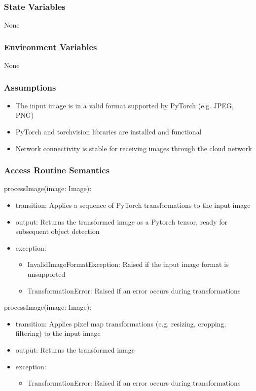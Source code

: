 \documentclass[12pt, titlepage]{article}
\begin{document}
\subsubsection{State Variables}
None



\subsubsection{Environment Variables}
None

\subsubsection{Assumptions}
\begin{itemize}
  \item The input image is in a valid format supported by PyTorch (e.g. JPEG, PNG)
  \item PyTorch and torchvision libraries are installed and functional
  \item Network connectivity is stable for receiving images through the cloud network
\end{itemize}


\subsubsection{Access Routine Semantics}

\noindent processImage(image: Image):
\begin{itemize}
\item transition: Applies a sequence of PyTorch transformations to the input image 
\item output: Returns the transformed image as a Pytorch tensor, ready for subsequent object detection
\item exception: 
\begin{itemize}
  \item InvalidImageFormatException: Raised if the input image format is unsupported
  \item TransformationError: Raised if an error occurs during transformations
\end{itemize}

\end{itemize}
\noindent processImage(image: Image):
\begin{itemize}
  \item transition: Applies pixel map transformations (e.g. resizing, cropping, filtering) to the input image
  \item output: Returns the transformed image
  \item exception: 
  \begin{itemize}
    \item TransformationError: Raised if an error occurs during transformations
  \end{itemize}
  
  \end{itemize}
\end{document}
